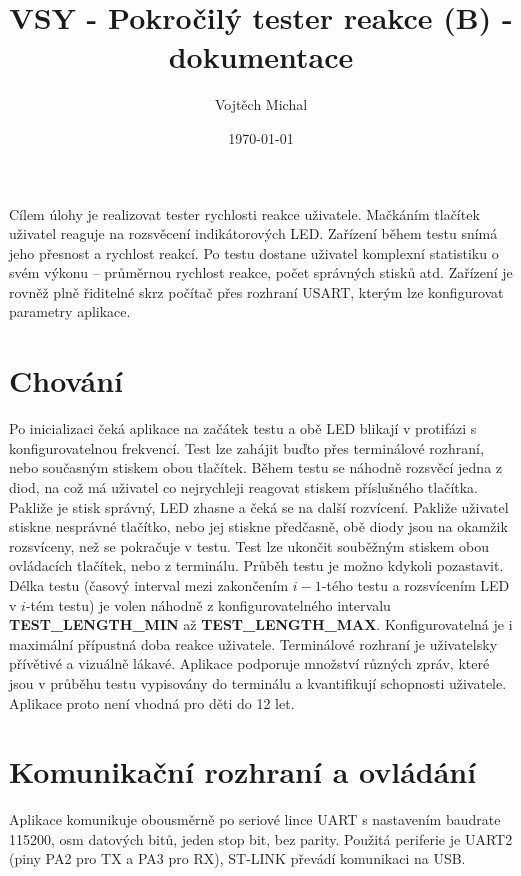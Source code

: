 \documentclass[twoside]{article}
\title{VSY - Pokročilý tester reakce (B) - dokumentace}
\author{Vojtěch Michal}
\date{\today}
\begin{document}
\maketitle

Cílem úlohy je realizovat tester rychlosti reakce uživatele. Mačkáním tlačítek uživatel reaguje na rozsvěcení indikátorových LED.
Zařízení během testu snímá jeho přesnost a rychlost reakcí. Po testu dostane uživatel komplexní statistiku o svém výkonu -- průměrnou
rychlost reakce, počet správných stisků atd. Zařízení je rovněž plně řiditelné skrz počítač přes rozhraní USART, kterým lze konfigurovat
parametry aplikace.

\section{Chování}
\label{sec:chovani}

Po inicializaci čeká aplikace na začátek testu a obě LED blikají v protifázi s konfigurovatelnou frekvencí.
Test lze zahájit buďto přes terminálové rozhraní, nebo současným stiskem obou tlačítek.
Během testu se náhodně rozsvěcí jedna z diod, na což má uživatel co nejrychleji reagovat stiskem příslušného tlačítka.
Pakliže je stisk správný, LED zhasne a čeká se na další rozvícení. Pakliže uživatel stiskne nesprávné tlačítko, nebo jej stiskne
předčasně, obě diody jsou na okamžik rozsvíceny, než se pokračuje v testu. Test lze ukončit souběžným stiskem obou
ovládacích tlačítek, nebo z terminálu. Průběh testu je možno kdykoli pozastavit.
Délka testu (časový interval mezi zakončením $i-1$-tého testu a rozsvícením LED v $i$-tém testu)
je volen náhodně z konfigurovatelného intervalu \textbf{TEST\_LENGTH\_MIN} až \textbf{TEST\_LENGTH\_MAX}.
Konfigurovatelná je i maximální přípustná doba reakce uživatele.
Terminálové rozhraní je uživatelsky přívětivé a vizuálně lákavé. Aplikace podporuje množství různých zpráv, které jsou 
v průběhu testu vypisovány do terminálu a kvantifikují schopnosti uživatele.
Aplikace proto není vhodná pro děti do 12 let.

\section{Komunikační rozhraní a ovládání}

Aplikace komunikuje obousměrně po seriové lince UART s nastavením baudrate 115200,
osm datových bitů, jeden stop bit, bez parity. Použitá periferie je UART2 (piny PA2 pro TX a PA3 pro RX),
ST-LINK převádí komunikaci na USB.
\end{document}
